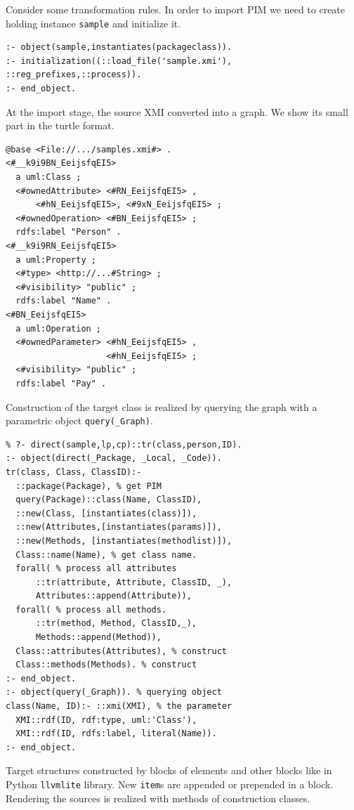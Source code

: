 \documentclass[runningheads]{llncs}
\begin{document}
Consider some transformation rules. In order to import PIM we need to create holding instance \texttt{sample} and initialize it.
\begin{verbatim}
:- object(sample,instantiates(packageclass)).
:- initialization((::load_file('sample.xmi'), ::reg_prefixes,::process)).
:- end_object.
\end{verbatim}
At the import stage, the source XMI converted into a graph.  We show its small part in the turtle format.
\begin{verbatim}
@base <File://.../samples.xmi#> .
<#__k9i9BN_EeijsfqEI5>
  a uml:Class ;
  <#ownedAttribute> <#RN_EeijsfqEI5> ,
      <#hN_EeijsfqEI5>, <#9xN_EeijsfqEI5> ;
  <#ownedOperation> <#BN_EeijsfqEI5> ;
  rdfs:label "Person" .
<#__k9i9RN_EeijsfqEI5>
  a uml:Property ;
  <#type> <http://...#String> ;
  <#visibility> "public" ;
  rdfs:label "Name" .
<#BN_EeijsfqEI5>
  a uml:Operation ;
  <#ownedParameter> <#hN_EeijsfqEI5> ,
                    <#hN_EeijsfqEI5> ;
  <#visibility> "public" ;
  rdfs:label "Pay" .
\end{verbatim}

Construction of the target class is realized by querying the graph with a parametric object \texttt{query(\_Graph)}.
\begin{verbatim}
% ?- direct(sample,lp,cp)::tr(class,person,ID).
:- object(direct(_Package, _Local, _Code)).
tr(class, Class, ClassID):-
  ::package(Package), % get PIM
  query(Package)::class(Name, ClassID),
  ::new(Class, [instantiates(class)]),
  ::new(Attributes,[instantiates(params)]),
  ::new(Methods, [instantiates(methodlist)]),
  Class::name(Name), % get class name.
  forall( % process all attributes
      ::tr(attribute, Attribute, ClassID, _),
      Attributes::append(Attribute)),
  forall( % process all methods.
      ::tr(method, Method, ClassID,_),
      Methods::append(Method)),
  Class::attributes(Attributes), % construct
  Class::methods(Methods). % construct
:- end_object.
:- object(query(_Graph)). % querying object
class(Name, ID):- ::xmi(XMI), % the parameter
  XMI::rdf(ID, rdf:type, uml:'Class'),
  XMI::rdf(ID, rdfs:label, literal(Name)).
:- end_object.
\end{verbatim}

Target structures constructed by blocks of elements and other blocks like in Python \texttt{llvmlite} library.  New \texttt{item}s are appended or prepended in a block.  Rendering the sources is realized with methods of construction classes.
\end{document}
